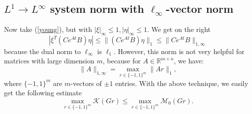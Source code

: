 \documentclass[12pt, a4paper,reqno]{amsart}
\theoremstyle{definition}
\begin{document}
\subsection{$L^1 \to L^\infty$ system norm with  $\ell_\infty$-vector norm} 
\label{sect_other}
Now take (\ref{young}), but with 
$|\xi|_\infty \leq 1,|\eta|_\infty \leq 1$. We get on the right
$$
|\xi^T (Ce^{At}B) \eta| \leq \|(C e^{At}B)\eta\|_1 \leq \| Ce^{At}B\|_{1,\infty}
$$
because the dual norm to $\ell_\infty$ is $\ell_1$. However, this norm is not very helpful for matrices with large dimension $m$, because for $A\in \mathbb R^{m \times n}$, we have:
$$
\|A\|_{1,\infty} = \max_{r\in \{-1,1\}^m} \|Ar\|_1,
$$
where $\{-1,1\}^m$ are $m$-vectors of $\pm 1$ entries.
With the above technique,  
we easily get the following estimate
$$
\max_{r\in \{-1,1\}^m} \mathcal K(G r) \leq  \max_{r \in \{-1,1\}^m}  \mathcal M_0(Gr).
$$
\end{document}
